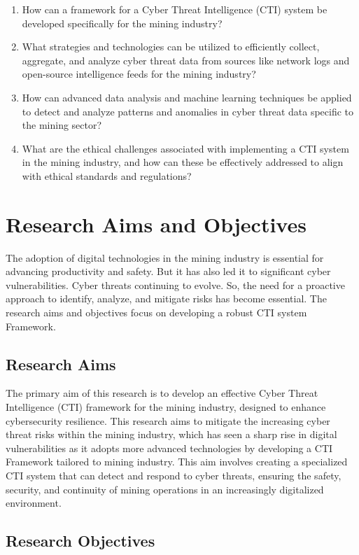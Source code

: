\documentclass[a4paper,twoside,12pt]{report}
\begin{document}
\begin{enumerate}
    \item {How can a framework for a Cyber Threat Intelligence (CTI) system be developed specifically for the mining industry?}
 \item {What strategies and technologies can be utilized to efficiently collect, aggregate, and analyze cyber threat data from sources like network logs and open-source intelligence feeds for the mining industry?}

    \item {How can advanced data analysis and machine learning techniques be applied to detect and analyze patterns and anomalies in cyber threat data specific to the mining sector?}

    \item {What are the ethical challenges associated with implementing a CTI system in the mining industry, and how can these be effectively addressed to align with ethical standards and regulations?}
\end{enumerate}
\section{Research Aims and Objectives}
The adoption of digital technologies in the mining industry is essential for advancing productivity and safety. But it has also led it to significant cyber vulnerabilities. Cyber threats continuing to evolve. So, the need for a proactive approach to identify, analyze, and mitigate risks has become essential. The research aims and objectives focus on developing a robust CTI system Framework.\\
\subsection{Research Aims}
The primary aim of this research is to develop an effective Cyber Threat Intelligence (CTI) framework for the mining industry, designed to enhance cybersecurity resilience. This research aims to mitigate the increasing cyber threat risks within the mining industry, which has seen a sharp rise in digital vulnerabilities as it adopts more advanced technologies by developing a CTI Framework tailored to mining industry. This aim involves creating a specialized CTI system that can detect and respond to cyber threats, ensuring the safety, security, and continuity of mining operations in an increasingly digitalized environment.
\subsection{Research Objectives}
\end{document}
